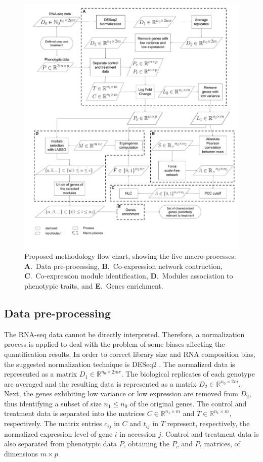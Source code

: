 \documentclass[12pt,journal, onecolumn]{IEEEtran}
\begin{document}
\begin{figure}[]
  \centering
    \includegraphics[clip,width=1\textwidth]{Figures/flow_chart.pdf}
  \caption{Proposed methodology flow chart, showing the five macro-processes: \textbf{A}.~Data pre-processing, \textbf{B}.~Co-expression network contruction, \textbf{C}.~Co-expression module identification, \textbf{D}.~Modules association to phenotypic traits, and \textbf{E}.~Genes enrichment.}
  \label{fig:flow_chart}
\end{figure}

\subsection{Data pre-processing}

The RNA-seq data cannot be directly interpreted. Therefore, a normalization process is applied to deal with the problem of some biases affecting the quantification results. In order to correct library size and RNA composition bias, the suggested normalization technique is DESeq2 \cite{love2014moderated}. The normalized data is represented as a matrix $D_1 \in \mathbb{R}^{n_0 \times 2mr}$. The biological replicates of each genotype are averaged and the resulting data is represented as a matrix $D_2 \in \mathbb{R}^{n_0 \times 2m}$. Next, the genes exhibiting low variance or low expression are removed from $D_2$, thus identifying a subset of size $n_1 \leq n_0$ of the original genes. The control and treatment data is separated into the matrices $C\in \mathbb{R}^{n_1 \times m}$ and $T\in \mathbb{R}^{n_1 \times m}$, respectively. The matrix entries $c_{ij}$ in $C$ and $t_{ij}$ in $T$ represent, respectively, the normalized expression level of gene $i$ in accession $j$. Control and treatment data is also separated from phenotypic data $P$, obtaining the $P_c$ and $P_t$ matrices, of dimensions $m \times p$.\\
\end{document}
